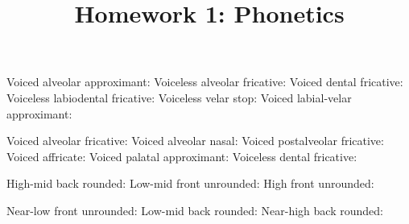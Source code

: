 \documentclass[addpoints]{exam}
\title{Homework 1: Phonetics}
\date{}
\begin{document}
  \maketitle

  


  \begin{questions}
      \parbox[t]{0.45\linewidth}{
        \question[1] \hrulefill
        \question[1] \hrulefill
        \question[1] \hrulefill
        \question[1] \hrulefill
        \question[1] \hrulefill
      }
      \hspace{0.1\linewidth}
      \parbox[t]{0.45\linewidth}{
        \question[1] \hrulefill
        \question[1] \hrulefill
        \question[1] \hrulefill
        \question[1] \hrulefill
        \question[1] \hrulefill
      }

      \parbox[t]{0.45\linewidth}{
        \question[1] Voiced alveolar approximant: \hrulefill
        \question[1] Voiceless alveolar fricative: \hrulefill
        \question[1] Voiced dental fricative: \hrulefill
        \question[1] Voiceless labiodental fricative: \hrulefill
        \question[1] Voiceless velar stop: \hrulefill
        \question[1] Voiced labial-velar approximant: \hrulefill
      }
      \hspace{0.1\linewidth}
      \parbox[t]{0.45\linewidth}{
        \question[1] Voiced alveolar fricative: \hrulefill
        \question[1] Voiced alveolar nasal: \hrulefill
        \question[1] Voiced postalveolar fricative: \hrulefill
        \question[1] Voiced affricate: \hrulefill
        \question[1] Voiced palatal approximant: \hrulefill
        \question[1] Voiceless dental fricative: \hrulefill
      }

      \parbox[t]{0.45\linewidth}{
        \question[1] High-mid back rounded: \hrulefill
        \question[1] Low-mid front unrounded: \hrulefill
        \question[1] High front unrounded: \hrulefill
      }
      \hspace{0.1\linewidth}
      \parbox[t]{0.45\linewidth}{
        \question[1] Near-low front unrounded: \hrulefill
        \question[1] Low-mid back rounded: \hrulefill
        \question[1] Near-high back rounded: \hrulefill
      }


\end{questions}
\end{document}
